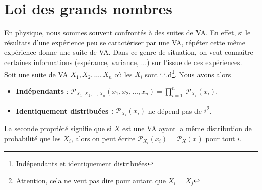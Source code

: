 \documentclass[a4paper,12pt]{report}
\theoremstyle{definition}
\renewcommand{\(}{\left(}
\renewcommand{\)}{\right)}
\renewcommand{\b}{\textbf}
\renewcommand{\P}{\mathcal{P}}
\begin{document}
    \section{Loi des grands nombres}
    
        En physique, nous sommes souvent confrontés à des suites de VA. En effet, si le résultats d'une expérience peu se caractériser par une VA, répéter cette même expérience donne une suite de VA. Dans ce genre de situation, on veut connaître certaines informations (espérance, variance, ...) sur l'issue de ces expériences.\\
        
        Soit une suite de VA $X_1,X_2,\dots,X_n$ où les $X_i$ sont i.i.d\footnote{Indépendants et identiquement distribuées}. Nous avons alors
        \begin{itemize}[label = \textbullet]
            \item \b{Indépendants} : $\P_{X_1,X_2,\dots,X_n}(x_1,x_2,\dots,x_n) = \prod_{i=1}^{n}~\P_{X_i}(x_i)$.
            \item \b{Identiquement distribuées : }$\P_{X_i}(x_i)$ ne dépend pas de $i$\footnote{Attention, cela ne veut pas dire pour autant que $X_i=X_j$}.
        \end{itemize}
        La seconde propriété signifie que si $X$ est une VA ayant la même distribution de probabilité que les $X_i$, alors on peut écrire $\P_{X_i}(x_i) = \P_X(x)$ pour tout $i$.\\
        
\end{document}
